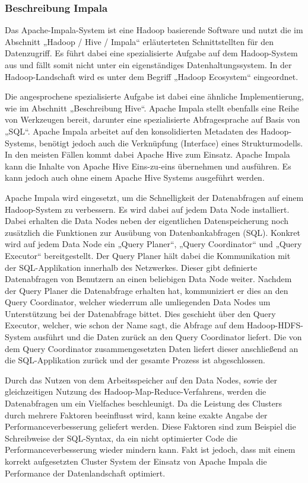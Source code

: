 \subsubsection{Beschreibung Impala}
\label{subsubsec:impala_beschreibung}
Das Apache\hyp{}Impala\hyp{}System ist eine Hadoop basierende Software und nutzt die
im Abschnitt „Hadoop / Hive / Impala“ erläuterteten Schnittstellten
für den Datenzugriff. Es führt dabei eine spezialisierte Aufgabe auf dem
Hadoop\hyp{}System aus und fällt somit nicht unter ein eigenständiges
Datenhaltungssystem. In der Hadoop\hyp{}Landschaft wird es unter dem Begriff
„Hadoop Ecosystem“ eingeordnet.

Die angesprochene spezialisierte Aufgabe ist dabei eine ähnliche
Implementierung, wie im Abschnitt „Beschreibung Hive“. Apache
Impala stellt ebenfalls eine Reihe von Werkzeugen bereit, darunter eine
spezialisierte Abfragesprache auf Basis von „SQL“. Apache Impala arbeitet auf
den konsolidierten Metadaten des Hadoop\hyp{}Systems, benötigt jedoch auch die
Verknüpfung (Interface) eines Strukturmodells. In den meisten Fällen kommt
dabei Apache Hive zum Einsatz. Apache Impala kann die Inhalte von Apache Hive
Eins\hyp{}zu\hyp{}eins übernehmen und ausführen. Es kann jedoch auch ohne einem
Apache Hive Systems ausgeführt werden.

Apache Impala wird eingesetzt, um die Schnelligkeit der Datenabfragen auf einem
Hadoop\hyp{}System zu verbessern. Es wird dabei auf jedem Data Node
installiert.  Dabei erhalten die Data Nodes neben der eigentlichen
Datenspeicherung noch zusätzlich die Funktionen zur Ausübung von
Datenbankabfragen (SQL). Konkret wird auf jedem Data Node ein „Query Planer“,
„Query Coordinator“ und „Query Executor“ bereitgestellt. Der Query Planer hält
dabei die Kommunikation mit der SQL\hyp{}Applikation innerhalb des Netzwerkes.
Dieser gibt definierte Datenabfragen von Benutzern an einen beliebigen Data
Node weiter. Nachdem der Query Planer die Datenabfrage erhalten hat,
kommuniziert er dies an den Query Coordinator, welcher wiederrum alle
umliegenden Data Nodes um Unterstützung bei der Datenabfrage bittet. Dies
geschieht über den Query Executor, welcher, wie schon der Name sagt, die
Abfrage auf dem Hadoop\hyp{}HDFS\hyp{}System ausführt und die Daten zurück an
den Query Coordinator liefert. Die von dem Query Coordinator zusammengesetzten
Daten liefert dieser anschließend an die SQL\hyp{}Applikation zurück und der
gesamte Prozess ist abgeschlossen.

Durch das Nutzen von dem Arbeitsspeicher auf den Data Nodes, sowie der
gleichzeitigen Nutzung des Hadoop\hyp{}Map\hyp{}Reduce\hyp{}Verfahrens, werden
die Datenabfragen um ein Vielfaches beschleunigt. Da die Leistung des Clusters
durch mehrere Faktoren beeinflusst wird, kann keine exakte Angabe der
Performanceverbesserung geliefert werden. Diese Faktoren sind zum Beispiel die
Schreibweise der SQL\hyp{}Syntax, da ein nicht optimierter Code die
Performanceverbesserung wieder mindern kann. Fakt ist jedoch, dass mit einem
korrekt aufgesetzten Cluster System der Einsatz von Apache Impala die
Performance der Datenlandschaft optimiert.
\nl%

